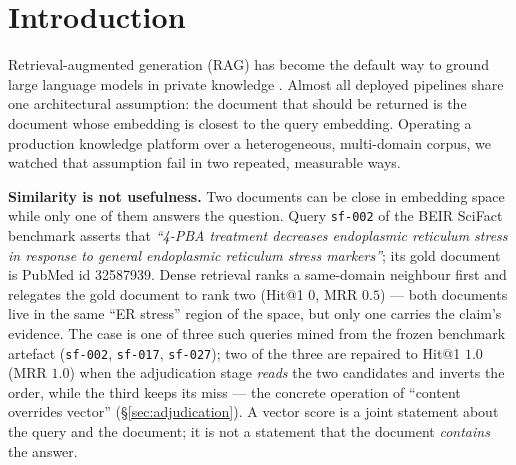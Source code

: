 \documentclass[sigconf, review, anonymous]{acmart}
\begin{document}


\maketitle

\section{Introduction}\label{sec:intro}

Retrieval-augmented generation (RAG) has become the default way to ground large
language models in private knowledge \cite{lewis2020rag,gao2024ragsurvey}.
Almost all deployed pipelines share one architectural assumption: the document
that should be returned is the document whose embedding is closest to the query
embedding. Operating a production knowledge platform over a heterogeneous,
multi-domain corpus, we watched that assumption fail in two repeated,
measurable ways.

\noindent\textbf{Similarity is not usefulness.} Two documents can be close in
embedding space while only one of them answers the question. Query
\texttt{sf-002} of the BEIR SciFact benchmark asserts that \emph{``4-PBA
treatment decreases endoplasmic reticulum stress in response to general
endoplasmic reticulum stress markers''}; its gold document is PubMed id
32587939. Dense retrieval ranks a same-domain neighbour first and relegates
the gold document to rank two (Hit@1 $0$, MRR $0.5$) --- both documents live
in the same ``ER stress'' region of the space, but only one carries the
claim's evidence. The case is one of three such queries mined from the frozen
benchmark artefact (\texttt{sf-002}, \texttt{sf-017}, \texttt{sf-027}); two
of the three are repaired to Hit@1 $1.0$ (MRR $1.0$) when the adjudication
stage \emph{reads} the two candidates and inverts the order, while the third
keeps its miss --- the
concrete operation of ``content overrides vector''
(\S\ref{sec:adjudication}). A vector score is a joint statement about
the query and the document; it is not a statement that the document
\emph{contains} the answer.
\end{document}
